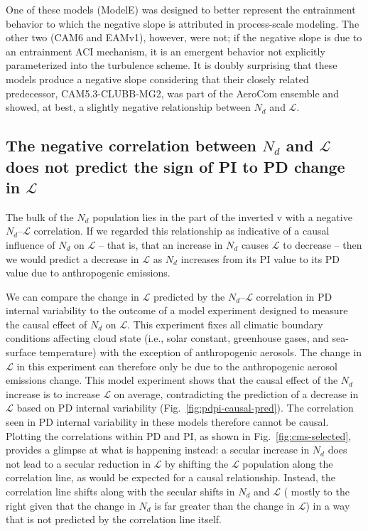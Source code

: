 \documentclass[acp, manuscript]{copernicus}\usepackage[]{graphicx}\usepackage[]{xcolor}
\newcommand\nd{\ensuremath{N_d}}
\newcommand\lwp{\ensuremath{\mathcal L}}
\begin{document}
One of these models (ModelE) was designed
to better represent the entrainment behavior to which the negative slope is
attributed in process-scale modeling.  The other two (CAM6 and EAMv1), however,
were not; if the negative slope is due to an entrainment ACI mechanism, it is an
emergent behavior not explicitly parameterized into the turbulence scheme.  It is doubly surprising that these models produce a
negative slope considering that their closely related predecessor,
CAM5.3-CLUBB-MG2, was part of the AeroCom ensemble and showed, at best, a
slightly negative relationship between \nd{} and \lwp.


\subsection{The negative correlation between \nd{} and \lwp{} does not predict
  the sign of PI to PD change in \lwp}

The bulk of the \nd{} population lies in the part of the inverted v with a
negative \nd--\lwp{} correlation.  If we regarded this relationship as indicative of
a causal influence of \nd{} on \lwp{} -- that is, that an increase in \nd{} causes
\lwp{} to decrease -- then we would predict a decrease in \lwp{} as \nd{}
increases from its PI value to its PD value due to anthropogenic emissions.

We can compare the change in \lwp{} predicted by the \nd--\lwp{} correlation in
PD internal variability to the outcome of a model experiment designed to measure
the causal effect of \nd{} on \lwp.  This experiment fixes all climatic boundary
conditions affecting cloud state (i.e., solar constant, greenhouse gases, and sea-surface temperature) with the exception of anthropogenic aerosols.  The
change in \lwp{} in this experiment can therefore only be due to the
anthropogenic aerosol emissions change.  This model experiment shows that the
causal effect of the \nd{} increase is to increase \lwp{} on average, contradicting
the prediction of a decrease in \lwp{} based on PD internal variability
(Fig.~\ref{fig:pdpi-causal-pred}).  The correlation seen in PD internal variability in
these models therefore cannot be causal.  Plotting the correlations within PD
and PI, as shown in Fig.~\ref{fig:cms-selected}, provides a glimpse at what is
happening instead: a secular increase in \nd{} does not lead to a secular
reduction in \lwp{} by shifting the \lwp{} population along the correlation
line, as would be expected for a causal relationship.  Instead, the correlation
line shifts along with the secular shifts in \nd{} and \lwp{} ( mostly to
the right given that the change in \nd{} is far greater than the change in \lwp)
in a way that is not predicted by the correlation line itself.
\end{document}
